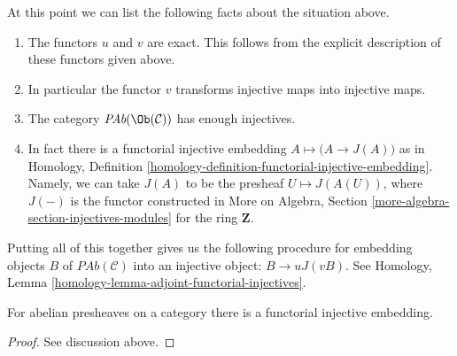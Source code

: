 \medskip\noindent
At this point we can list the following facts
about the situation above.
\begin{enumerate}
\item The functors $u$ and $v$ are exact. This follows from
the explicit description of these functors given above.
\item In particular the functor $v$ transforms injective maps
into injective maps.
\item The category $\textit{PAb}(\Ob(\mathcal{C}))$
has enough injectives.
\item In fact there is a functorial injective embedding
$A \mapsto \big(A \to J(A)\big)$ as in
Homology, Definition \ref{homology-definition-functorial-injective-embedding}.
Namely, we can take $J(A)$ to be the
presheaf $U\mapsto J(A(U))$, where
$J(-)$ is the functor constructed in
More on Algebra, Section \ref{more-algebra-section-injectives-modules}
for the ring $\mathbf{Z}$.
\end{enumerate}
Putting all of this together gives us the following procedure
for embedding objects $B$ of $\textit{PAb}(\mathcal{C})$ into
an injective object: $B \to uJ(vB)$. See
Homology, Lemma \ref{homology-lemma-adjoint-functorial-injectives}.

\begin{proposition}
\label{proposition-presheaves-injectives}
For abelian presheaves on a category there is a functorial injective
embedding.
\end{proposition}

\begin{proof}
See discussion above.
\end{proof}












